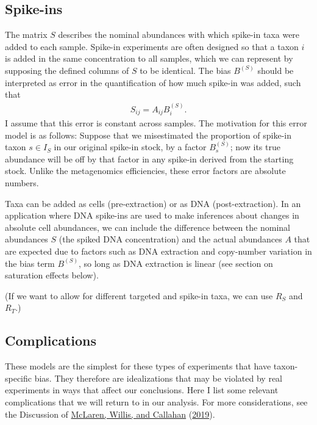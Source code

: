 \documentclass[
]{article}
\theoremstyle{definition}
\theoremstyle{definition}
\theoremstyle{definition}
\theoremstyle{definition}
\theoremstyle{remark}
\begin{document}
\hypertarget{spike-ins}{%
\subsection{Spike-ins}\label{spike-ins}}

The matrix \(S\) describes the nominal abundances with which spike-in taxa were added to each sample.
Spike-in experiments are often designed so that a taxon \(i\) is added in the same concentration to all samples, which we can represent by supposing the defined columns of \(S\) to be identical.
The bias \(B^{(S)}\) should be interpreted as error in the quantification of how much spike-in was added, such that
\begin{align}
  \label{eq:S}
  S_{ij} = A_{ij} B^{(S)}_i.
\end{align}
I assume that this error is constant across samples.
The motivation for this error model is as follows: Suppose that we misestimated the proportion of spike-in taxon \(s\in I_S\) in our original spike-in stock, by a factor \(B^{(S)}_s\); now its true abundance will be off by that factor in any spike-in derived from the starting stock.
Unlike the metagenomics efficiencies, these error factors are absolute numbers.

Taxa can be added as cells (pre-extraction) or as DNA (post-extraction).
In an application where DNA spike-ins are used to make inferences about changes in absolute cell abundances, we can include the difference between the nominal abundances \(S\) (the spiked DNA concentration) and the actual abundances \(A\) that are expected due to factors such as DNA extraction and copy-number variation in the bias term \(B^{(S)}\), so long as DNA extraction is linear (see section on saturation effects below).

(If we want to allow for different targeted and spike-in taxa, we can use \(R_S\) and \(R_T\).)

\hypertarget{complications}{%
\subsection{Complications}\label{complications}}

These models are the simplest for these types of experiments that have taxon-specific bias.
They therefore are idealizations that may be violated by real experiments in ways that affect our conclusions.
Here I list some relevant complications that we will return to in our analysis.
For more considerations, see the Discussion of \protect\hyperlink{ref-mclaren2019cons}{McLaren, Willis, and Callahan} (\protect\hyperlink{ref-mclaren2019cons}{2019}).
\end{document}
